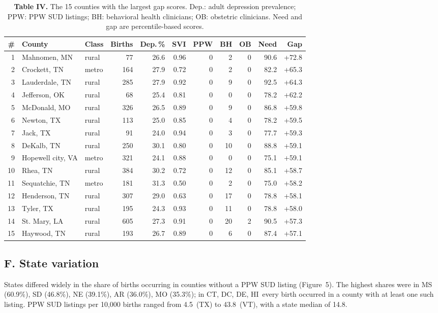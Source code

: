 \documentclass{article}
\begin{document}
\begin{table}
\centering
\caption{\textbf{Table IV.} The 15 counties with the largest gap scores. Dep.: adult depression prevalence; PPW: PPW SUD listings; BH: behavioral health clinicians; OB: obstetric clinicians. Need and gap are percentile-based scores.}

\begin{tabular}{@{}rllrrrrrrrr@{}}
\toprule
\# & County & Class & Births & Dep.\,\% & SVI & PPW & BH & OB & Need & Gap \\
\midrule
1 & Mahnomen, MN & rural & 77 & 26.6 & 0.96 & 0 & 2 & 0 & 90.6 & +72.8 \\
2 & Crockett, TN & metro & 164 & 27.9 & 0.72 & 0 & 2 & 0 & 82.2 & +65.3 \\
3 & Lauderdale, TN & rural & 285 & 27.9 & 0.92 & 0 & 9 & 0 & 92.5 & +64.3 \\
4 & Jefferson, OK & rural & 68 & 25.4 & 0.81 & 0 & 0 & 0 & 78.2 & +62.2 \\
5 & McDonald, MO & rural & 326 & 26.5 & 0.89 & 0 & 9 & 0 & 86.8 & +59.8 \\
6 & Newton, TX & rural & 113 & 25.0 & 0.85 & 0 & 4 & 0 & 78.2 & +59.5 \\
7 & Jack, TX & rural & 91 & 24.0 & 0.94 & 0 & 3 & 0 & 77.7 & +59.3 \\
8 & DeKalb, TN & rural & 250 & 30.1 & 0.80 & 0 & 10 & 0 & 88.8 & +59.1 \\
9 & Hopewell city, VA & metro & 321 & 24.1 & 0.88 & 0 & 0 & 0 & 75.1 & +59.1 \\
10 & Rhea, TN & rural & 384 & 30.2 & 0.72 & 0 & 12 & 0 & 85.1 & +58.7 \\
11 & Sequatchie, TN & metro & 181 & 31.3 & 0.50 & 0 & 2 & 0 & 75.0 & +58.2 \\
12 & Henderson, TN & rural & 307 & 29.0 & 0.63 & 0 & 17 & 0 & 78.8 & +58.1 \\
13 & Tyler, TX & rural & 195 & 24.3 & 0.93 & 0 & 11 & 0 & 78.8 & +58.0 \\
14 & St. Mary, LA & rural & 605 & 27.3 & 0.91 & 0 & 20 & 2 & 90.5 & +57.3 \\
15 & Haywood, TN & rural & 193 & 26.7 & 0.89 & 0 & 6 & 0 & 87.4 & +57.1 \\
\bottomrule
\end{tabular}
\end{table}

\subsection*{F. State variation}
States differed widely in the share of births occurring in counties without a PPW SUD listing (Figure~5). The highest shares were in MS (60.9\%), SD (46.8\%), NE (39.1\%), AR (36.0\%), MO (35.3\%); in CT, DC, DE, HI\ every birth occurred in a county with at least one such listing. PPW SUD listings per 10,000 births ranged from 4.5\ (TX) to 43.8\ (VT), with a state median of 14.8.
\end{document}
